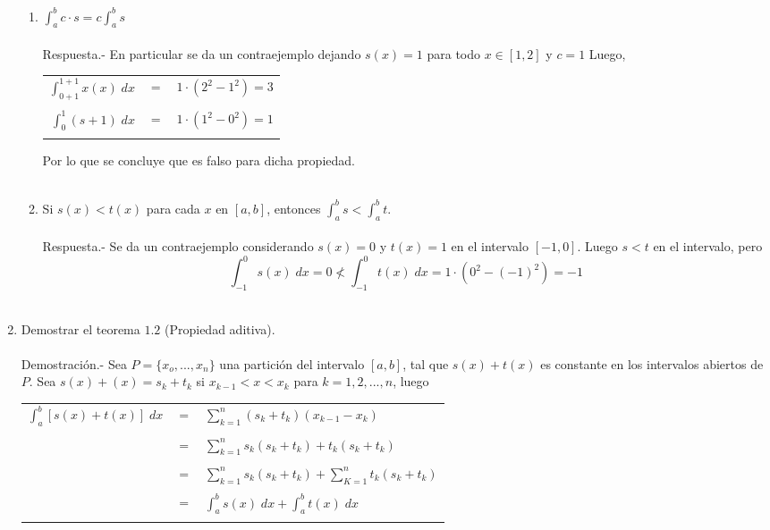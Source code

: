 \begin{enumerate}[ \bfseries 1.]
\begin{enumerate}[\bfseries (a)]
	\item $\displaystyle\int_{a}^{b} c\cdot s = c\int_{a}^{b} s$\\\\
	    Respuesta.-\; En particular se da un contraejemplo dejando $s(x)=1$ para todo $x\in [1,2]$ y $c=1$ Luego,
	    \begin{center}
		\begin{tabular}{rcc}
		    $\displaystyle\int_{0+1}^{1+1} x(x) \;dx$&$=$&$1\cdot(2^2 - 1^2) = 3$\\\\
		    $\displaystyle\int_{0}^{1} (s+1) \;dx$&$=$&$1\cdot (1^2 - 0^2) = 1$\\\\
		\end{tabular}
	    \end{center}
	    Por lo que se concluye que es falso para dicha propiedad.\\\\

	\item Si $s(x)<t(x)$ para cada $x$ en $[a,b]$, entonces $\displaystyle\int_{a}^{b} s < \int_{a}^{b} t.$\\\\
	    Respuesta.-\; Se da un contraejemplo considerando $s(x)=0$ y $t(x)=1$ en el intervalo $[-1,0]$. Luego $s<t$ en el intervalo, pero $$\displaystyle\int_{-1}^{0} s(x) \;dx = 0 \not< \int_{-1}^{0} t(x) \; dx = 1\cdot(0^2 - (-1)^2) = -1$$\\

    \end{enumerate}

    \item Demostrar el teorema $1.2$ (Propiedad aditiva).\\\\
	Demostración.-\; Sea $P=\lbrace x_o,...,x_n \rbrace$ una partición del intervalo $[a,b]$, tal que $s(x) + t(x)$ es constante en los intervalos abiertos de $P$. Sea $s(x)+(x)=s_k + t_k$ si $x_{k-1}<x<x_k$ para $k=1,2,...,n$, luego
	\begin{center}
	    \begin{tabular}{rcl}
		$\displaystyle\int_{a}^{b} \left[ s(x) + t(x) \right] \; dx$&$=$&$\sum\limits_{k=1}^n (s_k + t_k)(x_{k-1} - x_k)$\\\\
		&$=$&$\sum\limits_{k=1}^n s_k(s_k + t_k) + t_k(s_k + t_k)$\\\\
		&$=$&$\sum\limits_{k=1}^n s_k(s_k + t_k) + \sum\limits_{K=1}^n t_k(s_k + t_k)$\\\\
		&$=$&$\displaystyle\int_{a}^{b} s(x) \; dx + \int_a^b t(x) \; dx$\\\\
	    \end{tabular}
	\end{center}


\end{enumerate}
